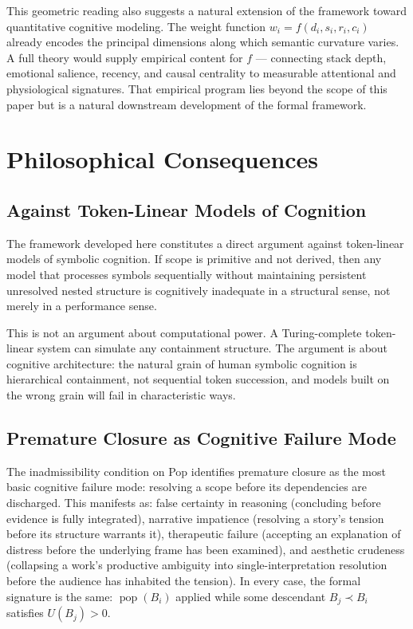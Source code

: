 \documentclass[12pt, a4paper]{article}
\theoremstyle{plain}
\theoremstyle{definition}
\theoremstyle{remark}
\DeclareMathOperator{\Pop}{pop}
\begin{document}
This geometric reading also suggests a natural extension of the framework
toward quantitative cognitive modeling. The weight function $w_i =
f(d_i, s_i, r_i, c_i)$ already encodes the principal dimensions along which
semantic curvature varies. A full theory would supply empirical content for
$f$ — connecting stack depth, emotional salience, recency, and causal
centrality to measurable attentional and physiological signatures. That
empirical program lies beyond the scope of this paper but is a natural
downstream development of the formal framework.

\section{Philosophical Consequences}

\subsection{Against Token-Linear Models of Cognition}

The framework developed here constitutes a direct argument against
token-linear models of symbolic cognition. If scope is primitive and not
derived, then any model that processes symbols sequentially without maintaining
persistent unresolved nested structure is cognitively inadequate in a
structural sense, not merely in a performance sense.

This is not an argument about computational power. A Turing-complete
token-linear system can simulate any containment structure. The argument is
about cognitive architecture: the natural grain of human symbolic cognition
is hierarchical containment, not sequential token succession, and models built
on the wrong grain will fail in characteristic ways.

\subsection{Premature Closure as Cognitive Failure Mode}

The inadmissibility condition on Pop identifies premature closure as the
most basic cognitive failure mode: resolving a scope before its dependencies
are discharged. This manifests as:
false certainty in reasoning (concluding before evidence is fully integrated),
narrative impatience (resolving a story's tension before its structure
warrants it),
therapeutic failure (accepting an explanation of distress before the
underlying frame has been examined), and
aesthetic crudeness (collapsing a work's productive ambiguity into
single-interpretation resolution before the audience has inhabited the
tension). In every case, the formal signature is the same: $\Pop(B_i)$ applied
while some descendant $B_j \prec B_i$ satisfies $U(B_j) > 0$.
\end{document}
